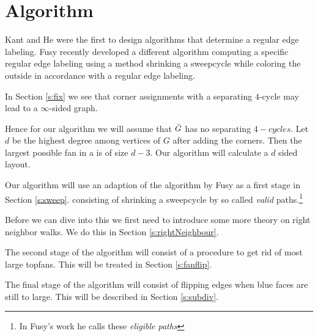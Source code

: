 
\section{Algorithm}
\label{s:algo}
Kant and He \cite{Kant1997} were the first to design algorithms that determine a regular edge labeling. Fusy \cite{Fusy2006} recently developed a different algorithm computing a specific regular edge labeling using a method shrinking a sweepcycle while coloring the outside in accordance with a regular edge labeling.

In Section \ref{s:fix} we see that corner assignments with a separating $4$-cycle may lead to a $\infty$-sided graph.

Hence for our algorithm we will assume that $\bar{G}$ has no separating $4-cycles$. Let $d$ be the highest degree among vertices of $G$ after adding the corners. Then the largest possible fan in a \rel is of size $d-3$. Our algorithm will calculate a $d$ sided layout.


Our algorithm will use an adaption of the algorithm by Fusy as a first stage in Section \ref{s:sweep}.  consisting of shrinking a sweepcycle by so called \emph{valid} paths.\footnote{In Fusy's work he calls these \emph{eligible paths}}

Before we can dive into this we first need to introduce some more theory on right neighbor walks. We do this in Section \ref{s:rightNeighbour}.

The second stage of the algorithm will consist of a procedure to get rid of most large topfans. This will be treated in Section \ref{s:fanflip}.

The final stage of the algorithm will consist of flipping edges when blue faces are still to large. This will be described in Section \ref{s:subdiv}.

